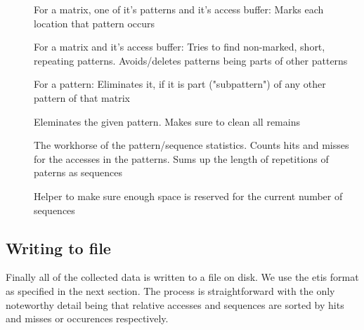 \begin{description}
\item[] For a matrix, one of it's patterns and it's access buffer: Marks each location that pattern occurs
\item[] For a matrix and it's access buffer: Tries to find non-marked, short, repeating patterns. Avoids/deletes patterns being parts of other patterns
\item[] For a pattern: Eliminates it, if it is part ("subpattern") of any other pattern of that matrix
\item[] Eleminates the given pattern. Makes sure to clean all remains
\item[] The workhorse of the pattern/sequence statistics. Counts hits and misses for the accesses in the patterns. Sums up the length of repetitions of paterns as sequences
\item[] Helper to make sure enough space is reserved for the current number of sequences

\end{description}

\subsection{Writing to file}

Finally all of the collected data is written to a file on disk. We use the etis format as specified in the next section. The process is straightforward with the only noteworthy detail being that relative accesses and sequences are sorted by hits and misses or occurences respectively.
